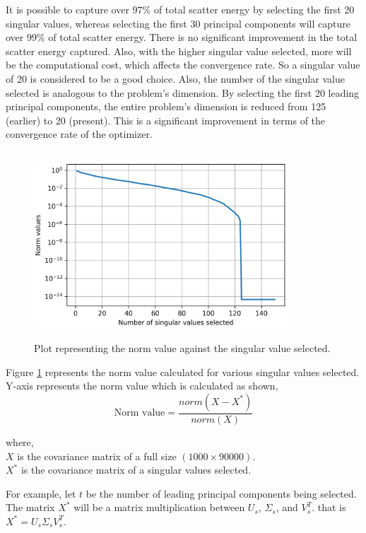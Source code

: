 It is possible to capture over $97\%$ of total scatter energy by selecting the first 20 singular values, whereas selecting the first 30 principal components will capture over $99\%$ of total scatter energy. There is no significant improvement in the total scatter energy captured. Also, with the higher singular value selected, more will be the computational cost, which affects the convergence rate. So a singular value of 20 is considered to be a good choice. Also, the number of the singular value selected is analogous to the problem's dimension. By selecting the first 20 leading principal components, the entire problem's dimension is reduced from 125 (earlier) to 20 (present). This is a significant improvement in terms of the convergence rate of the optimizer.  
\begin{figure}[!htbp]
    \centering
    \includegraphics[width = 0.85\textwidth, height=70mm]{figures/norm_x_plot.png}
    \caption{Plot representing the norm value against the singular value selected.}
    \label{norm plot}
\end{figure}

Figure \ref{norm plot} represents the norm value calculated for various singular values selected. Y-axis represents the norm value which is calculated as shown,
\begin{equation}
    \text{Norm value} = \frac{norm (X - X^*)}{norm (X)}
\end{equation}

where,\\
$X$ is the covariance matrix of a full size $(1000 \times 90000)$.\\
$X^*$ is the covariance matrix of a singular values selected.


For example, let $t$ be the number of leading principal components being selected. The matrix $X^*$ will be a matrix multiplication between $U_s$, $\Sigma_s$, and $V^T_s$. that is $X^* = U_s \Sigma_s V^T_s$.


